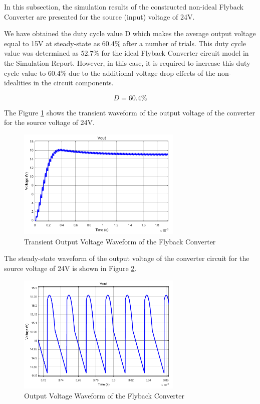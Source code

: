 In this subsection, the simulation results of the constructed non-ideal Flyback Converter are presented for the source (input) voltage of 24V.

We have obtained the duty cycle value D which makes the average output voltage equal to 15V at steady-state as 60.4\% after a number of trials. This duty cycle value was determined as 52.7\% for the ideal Flyback Converter circuit model in the Simulation Report. However, in this case, it is required to increase this duty cycle value to 60.4\% due to the additional voltage drop effects of the non-idealities in the circuit components.

$$ D = 60.4\% $$

The Figure \ref{fig:tran_out24} shows the transient waveform of the output voltage of the converter for the source voltage of 24V.

\begin{figure}[H]
\begin{center}
\includegraphics[width=0.7\textwidth]{figures/Vout_transient_24.png}
\caption{Transient Output Voltage Waveform of the Flyback Converter}
\label{fig:tran_out24}
\end{center}
\end{figure}

The steady-state waveform of the output voltage of the converter circuit for the source voltage of 24V is shown in Figure \ref{fig:out24}.

\begin{figure}[H]
\begin{center}
\includegraphics[width=0.7\textwidth]{figures/Vout_24.png}
\caption{Output Voltage Waveform of the Flyback Converter}
\label{fig:out24}
\end{center}
\end{figure}

